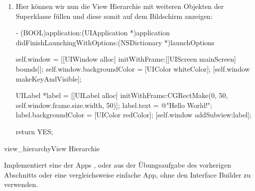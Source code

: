 \documentclass[parskip=half, final]{scrreprt}
\begin{document}
\begin{lecture}
\begin{enumerate}
\begin{objclst}
{    self.window = [[UIWindow alloc] initWithFrame:[[UIScreen mainScreen] bounds]];
    self.window.backgroundColor = [UIColor whiteColor];
    [self.window makeKeyAndVisible];

    return YES;
}
\end{objclst}
\item Hier können wir nun die View Hierarchie mit weiteren Objekten der Superklasse  füllen und diese somit auf dem Bildschirm anzeigen:
\begin{objclst}
- (BOOL)application:(UIApplication *)application didFinishLaunchingWithOptions:(NSDictionary *)launchOptions {

    self.window = [[UIWindow alloc] initWithFrame:[[UIScreen mainScreen] bounds]];
    self.window.backgroundColor = [UIColor whiteColor];
    [self.window makeKeyAndVisible];

    UILabel *label = [[UILabel alloc] initWithFrame:CGRectMake(0, 50, self.window.frame.size.width, 50)];
    label.text = @"Hello World!";
    label.backgroundColor = [UIColor redColor];
    [self.window addSubview:label];

    return YES;
}
\end{objclst}

\end{enumerate}

\begin{exc}

\begin{excitem}{view_hierarchy}{View Hierarchie}

Implementiert eine der Apps ,  oder  aus der Übungsaufgabe des vorherigen Abschnitts  oder eine vergleichsweise einfache App, ohne den Interface Builder zu verwenden.


\end{excitem}
\end{exc}
\end{lecture}
\end{document}
